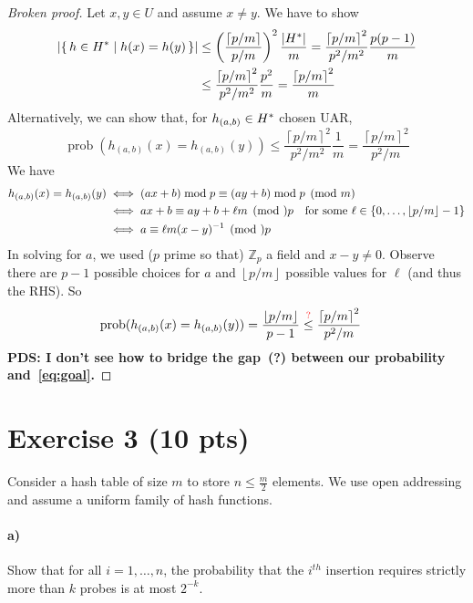 \documentclass[a4paper]{article}
\DeclareMathOperator{\prob}{prob}
\newcommand*{\floor}[1]{\left\lfloor{#1}\right\rfloor}
\newcommand*{\ceil}[1]{\left\lceil{#1}\right\rceil}
\newcommand{\ZZ}{\mathbb{Z}}
\newcommand*{\dave}[1]{{\color{red}\textbf{PDS: #1}}}
\begin{document}
\begin{proof}[Broken proof]
	\newcommand{\hh}{h_{(a,b)}}%
	Let $x, y \in U$ and assume $x \not= y$.
	We have to show
	\begin{align*}
		|\set{\,h \in \HH \mid h(x) = h(y)\,}| &\le \left(\frac{\ceil{p/m}}{p/m}\right)^2 \frac{|\HH|}{m} = \frac{\ceil{p/m}^2}{p^2/m^2} \frac{p(p-1)}{m} \\
			&\le \frac{\ceil{p/m}^2}{p^2/m^2} \frac{p^2}{m} = \frac{\ceil{p/m}^2}{m}
	\end{align*}
	Alternatively, we can show that, for $\hh\in\HH$ chosen UAR,
	\begin{equation}\label{eq:goal}
		\prob(\hh(x) = \hh(y))\le \frac{\ceil{p/m}^2}{p^2/m^2}\frac{1}{m} = \frac{\ceil{p/m}^2}{p^2/m}
	\end{equation}
	We have
	\begin{align*}
		\hh(x) = \hh(y) &\iff \mathrlap{(ax+b) \bmod p \equiv (ay+b) \bmod p \pmod m} \\
			&\iff ax+b \equiv ay+b+\ell m \pmod p	&\text{for some $\ell \in \set{0, \ldots, \floor{p/m}-1}$} \\
			&\iff a \equiv \ell m(x-y)^{-1} \pmod p
	\end{align*}
	In solving for $a$, we used ($p$ prime so that) $\ZZ_p$ a field and $x - y \not= 0$.
	Observe there are $p-1$ possible choices for $a$ and $\floor{p/m}$ possible values for $\ell$ (and thus the RHS).
	So
	\begin{align*}
		\prob(\hh(x) = \hh(y)) &= \frac{\floor{p/m}}{p-1} \overset{\text{\color{red}?}}{\le} \frac{\ceil{p/m}^2}{p^2/m}
	\end{align*}
	\dave{I don't see how to bridge the gap~(?) between our probability and~\eqref{eq:goal}.}
\end{proof}


\section{Exercise 3 (10 pts)}

\noindent Consider a hash table of size $m$ to store $n \le  \frac{m}{2}$ elements. We use open addressing and assume a uniform family of hash functions.

\paragraph{a)} Show that for all $i = 1, \ldots, n$, the probability that the $i^{th}$ insertion requires strictly more than $k$ probes is at most $2^{-k}$.
\end{document}
